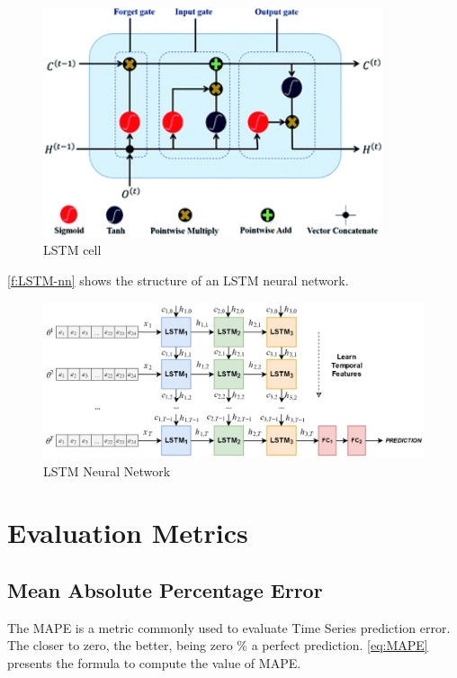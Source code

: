\begin{figure}[h]
\centering
\includegraphics[width=10cm]{figures/Ch2/LSTM_cell.png}
\caption{LSTM cell \cite{Guo2020}}
\label{f:LSTM-cell}
\end{figure}

\autoref{f:LSTM-nn} shows the structure of an \ac{LSTM} neural network.

\begin{figure}[h]
\centering
\includegraphics[width=\linewidth]{figures/Ch2/LSTM_nn.png}
\caption{LSTM Neural Network \cite{zapata2019}}
\label{f:LSTM-nn}
\end{figure}



\section{Evaluation Metrics}
\label{sec:section_Example}

\subsection{Mean Absolute Percentage Error}
The \ac{MAPE} is a metric commonly used to evaluate Time Series prediction error. The closer to zero, the better, being zero \% a perfect prediction. 
\autoref{eq:MAPE} presents the formula to compute the value of \ac{MAPE}.

